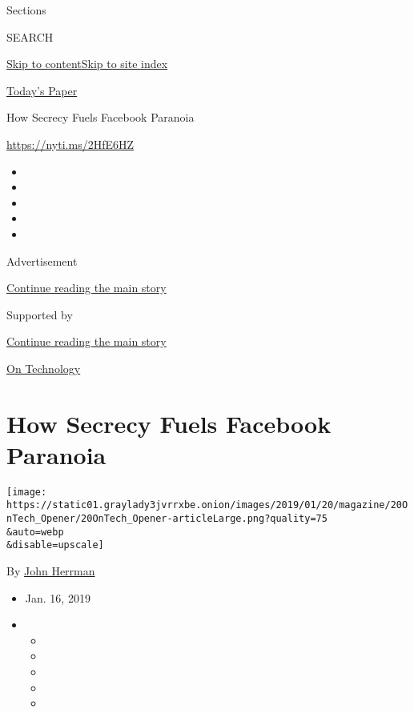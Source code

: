 Sections

SEARCH

\protect\hyperlink{site-content}{Skip to
content}\protect\hyperlink{site-index}{Skip to site index}

\href{https://myaccount.nytimes3xbfgragh.onion/auth/login?response_type=cookie\&client_id=vi}{}

\href{https://www.nytimes3xbfgragh.onion/section/todayspaper}{Today's
Paper}

How Secrecy Fuels Facebook Paranoia

\url{https://nyti.ms/2HfE6HZ}

\begin{itemize}
\item
\item
\item
\item
\item
\end{itemize}

Advertisement

\protect\hyperlink{after-top}{Continue reading the main story}

Supported by

\protect\hyperlink{after-sponsor}{Continue reading the main story}

\href{/column/on-technology}{On Technology}

\hypertarget{how-secrecy-fuels-facebook-paranoia}{%
\section{How Secrecy Fuels Facebook
Paranoia}\label{how-secrecy-fuels-facebook-paranoia}}

\texttt{[image: https://static01.graylady3jvrrxbe.onion/images/2019/01/20/magazine/20OnTech\_Opener/20OnTech\_Opener-articleLarge.png?quality=75\\\&auto=webp\\\&disable=upscale]}

By \href{https://www.nytimes3xbfgragh.onion/by/john-herrman}{John
Herrman}

\begin{itemize}
\item
  Jan. 16, 2019
\item
  \begin{itemize}
  \item
  \item
  \item
  \item
  \item
  \end{itemize}
\end{itemize}


